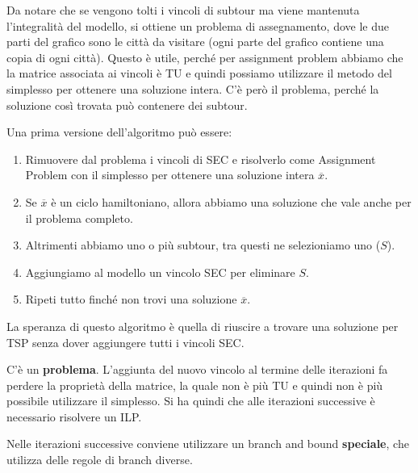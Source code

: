 Da notare che se vengono tolti i vincoli di subtour ma viene mantenuta l'integralità del modello, si ottiene un problema di assegnamento, dove le due parti del grafico sono le città da visitare (ogni parte del grafico contiene una copia di ogni città).
Questo è utile, perché per assignment problem abbiamo che la matrice associata ai vincoli è TU e quindi possiamo utilizzare il metodo del simplesso per ottenere una soluzione intera.
C'è però il problema, perché la soluzione così trovata può contenere dei subtour.

Una prima versione dell'algoritmo può essere:

\begin{enumerate}
	\item Rimuovere dal problema i vincoli di SEC e risolverlo come Assignment Problem con il simplesso per ottenere una soluzione intera $\overline{x}$.
	\item Se $\overline{x}$ è un ciclo hamiltoniano, allora abbiamo una soluzione che vale anche per il problema completo.
	\item Altrimenti abbiamo uno o più subtour, tra questi ne selezioniamo uno ($S$).
	\item Aggiungiamo al modello un vincolo SEC per eliminare $S$.
	\item Ripeti tutto finché non trovi una soluzione $\overline{x}$.
\end{enumerate}

La speranza di questo algoritmo è quella di riuscire a trovare una soluzione per TSP senza dover aggiungere tutti i vincoli SEC.

C'è un \textbf{problema}. L'aggiunta del nuovo vincolo al termine delle iterazioni fa perdere la proprietà della matrice, la quale non è più TU e quindi non è più possibile utilizzare il simplesso.
Si ha quindi che alle iterazioni successive è necessario risolvere un ILP.

Nelle iterazioni successive conviene utilizzare un branch and bound \textbf{speciale}, che utilizza delle regole di branch diverse.

